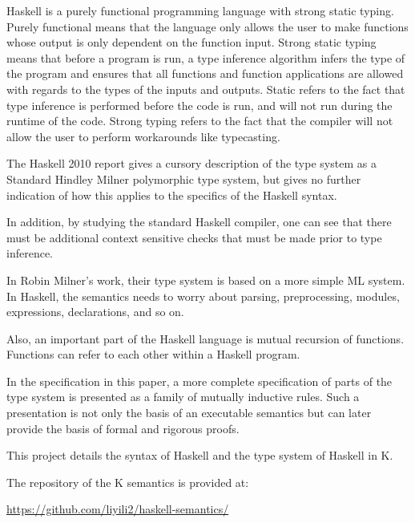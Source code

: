 Haskell is a purely functional programming language with strong static typing. Purely functional means that the language only allows the user to make functions whose output is only dependent on the function input. Strong static typing means that before a program is run, a type inference algorithm infers the type of the program and ensures that all functions and function applications are allowed with regards to the types of the inputs and outputs. Static refers to the fact that type inference is performed before the code is run, and will not run during the runtime of the code. Strong typing refers to the fact that the compiler will not allow the user to perform workarounds like typecasting.

The Haskell 2010 report gives a cursory description of the type system as a Standard Hindley Milner polymorphic type system, but gives no further indication of how this applies to the specifics of the Haskell syntax.

In addition, by studying the standard Haskell compiler, one can see that there must be additional context sensitive checks that must be made prior to type inference.

In Robin Milner's work, their type system is based on a more simple ML system. In Haskell, the semantics needs to worry about parsing, preprocessing, modules, expressions, declarations, and so on.

Also, an important part of the Haskell language is mutual recursion of functions. Functions can refer to each other within a Haskell program.

In the specification in this paper, a more complete specification of parts of the type system is presented as a family of mutually inductive rules. Such a presentation is not only the basis of an executable semantics but can later provide the basis of formal and rigorous proofs.

This project details the syntax of Haskell and the type system of Haskell in K.

The repository of the K semantics is provided at:

\url{https://github.com/liyili2/haskell-semantics/}